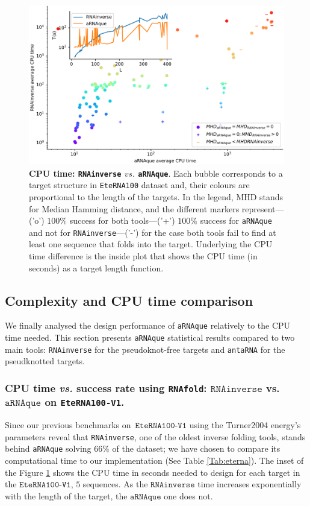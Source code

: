 \begin{figure}[t!]
	\begin{center}
		\includegraphics[width=0.98\columnwidth]{../res/images/arnaque/cpuvssuccess.pdf}
		\caption{\textbf{CPU time: \texttt{RNAinverse} $vs.$ \texttt{aRNAque}}. Each bubble corresponds to a target structure in \texttt{EteRNA100} dataset and, their colours are proportional to the length of the targets. In the legend, MHD stands for Median Hamming distance, and the different markers represent---('o') $100\%$ success for both tools---('+') $100\%$ success for \texttt{aRNAque} and not for \texttt{RNAinverse}---('-') for the case both tools fail to find at least one sequence that folds into the target. Underlying the CPU time difference is the inside plot that shows the CPU time (in seconds) as a target length function.}
		\label{719148}
	\end{center}
\end{figure}
\subsection{Complexity and CPU time comparison}
{\label{sec:complexity}}
We finally analysed the design performance of \texttt{aRNAque} relatively to the CPU time needed. This section presents \texttt{aRNAque} statistical results compared to two main tools: \texttt{RNAinverse} for the pseudoknot-free targets and \texttt{antaRNA} for the pseudknotted targets. 
\subsubsection{CPU time \emph{vs.} success rate using \texttt{RNAfold}:  \(\texttt{RNAinverse}\) vs. \(\texttt{aRNAque}\) on \texttt{EteRNA100-V1}. } 
Since our previous benchmarks on~\(\texttt{EteRNA100-V1}\) using the Turner2004 energy's parameters reveal that \texttt{RNAinverse}, one of the oldest inverse folding tools, stands behind \texttt{aRNAque} solving $66\%$ of the dataset; we have chosen to compare its computational time to our implementation (See Table \ref{Tab:eterna}).
The inset of the Figure {\ref{719148}} shows the CPU time in seconds needed to design for each target in the \(\texttt{EteRNA100-V1}\), \(5\) sequences. As the \(\texttt{RNAinverse}\) time increases exponentially with the length of the target, the \(\texttt{aRNAque}\) one does not. 

